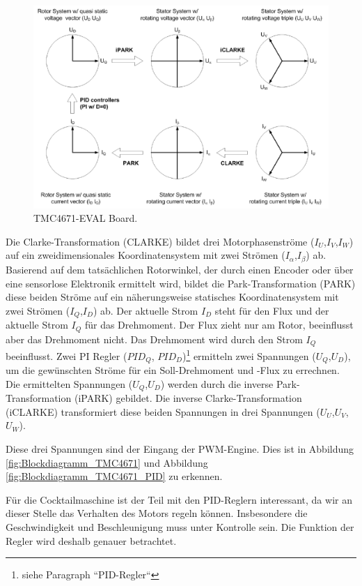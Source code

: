 \begin{figure}[h!]
	\centering
	\includegraphics[width=\textwidth]{graphics/PI_Regler_Park_and_Clarke.png}
	\caption{TMC4671-EVAL Board. \cite{trinamic_datasheet_2018}}
	\label{fig:TMC4671_EVAL_Board_Park_and_Clarke}
\end{figure}

Die Clarke-Transformation (CLARKE) bildet drei Motorphasenströme ($I_{U}$,$I_{V}$,$I_{W}$) auf ein zweidimensionales
Koordinatensystem mit zwei Strömen ($I_\alpha$,$I_\beta$) ab. Basierend auf dem tatsächlichen Rotorwinkel, der durch einen Encoder oder über eine sensorlose Elektronik ermittelt wird, bildet die Park-Transformation (PARK) diese beiden Ströme auf ein näherungsweise statisches
Koordinatensystem mit zwei Strömen ($I_Q$,$I_D$) ab. Der aktuelle Strom $I_D$ steht für den Flux und der aktuelle Strom $I_Q$ für das Drehmoment. Der Flux zieht nur am Rotor, beeinflusst aber das Drehmoment nicht. Das Drehmoment wird durch den Strom $I_Q$ beeinflusst.
Zwei PI Regler ($PID_Q$, $PID_D$)\footnote{siehe Paragraph ``PID-Regler``} ermitteln zwei Spannungen ($U_Q$,$U_D$), um die gewünschten Ströme für ein Soll-Drehmoment und -Flux zu errechnen. Die ermittelten Spannungen ($U_Q$,$U_D$) werden durch die inverse Park-Transformation (iPARK) gebildet. Die inverse Clarke-Transformation (iCLARKE) transformiert diese beiden Spannungen in drei Spannungen ($U_{U}$,$U_{V}$,$U_{W}$). \cite{trinamic_datasheet_2018}

Diese drei Spannungen sind der Eingang der PWM-Engine. Dies ist in Abbildung \ref{fig:Blockdiagramm_TMC4671} und Abbildung \ref{fig:Blockdiagramm_TMC4671_PID} zu erkennen.

Für die Cocktailmaschine ist der Teil mit den PID-Reglern interessant, da wir an dieser Stelle das Verhalten des Motors regeln können. Insbesondere die Geschwindigkeit und Beschleunigung muss unter Kontrolle sein. Die Funktion der Regler wird deshalb genauer betrachtet. 


